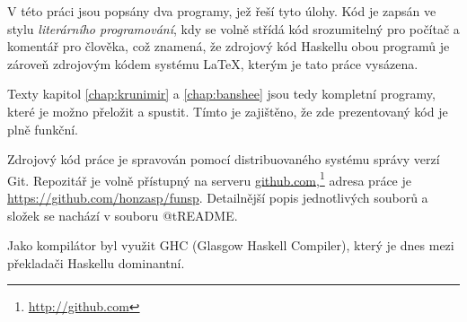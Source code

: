 V této práci jsou popsány dva programy, jež řeší tyto úlohy. Kód je zapsán ve
stylu \emph{literárního programování}, kdy se volně střídá kód srozumitelný pro
počítač a komentář pro člověka, což znamená, že zdrojový kód Haskellu obou
programů je zároveň zdrojovým kódem systému \LaTeX, kterým je tato práce
vysázena.

Texty kapitol \ref{chap:krunimir} a \ref{chap:banshee} jsou tedy kompletní
programy, které je možno přeložit a spustit. Tímto je zajištěno, že zde
prezentovaný kód je plně funkční.

Zdrojový kód práce je spravován pomocí distribuovaného systému správy verzí Git.
Repozitář je volně přístupný na serveru
\href{http://github.com}{github.com},\footnote{\url{http://github.com}} adresa
práce je \url{https://github.com/honzasp/funsp}. Detailnější popis jednotlivých
souborů a složek se nachází v souboru @t{README}.

Jako kompilátor byl využit GHC (Glasgow Haskell Compiler), který je dnes mezi
překladači Haskellu dominantní.
